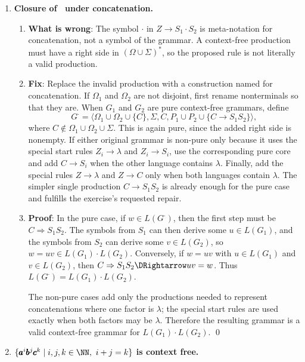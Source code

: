 \begin{enumerate}[{9.}1. ]
\item \textbf{Closure of \CSIG\ under concatenation.}

\begin{enumerate}
\item \textbf{What is wrong}: The symbol $\cdot$ in $Z \to S_1 \cdot S_2$ is
meta-notation for concatenation, not a symbol of the grammar.  A context-free
production must have a right side in $(\Omega \cup \Sigma)^*$, so the proposed
rule is not literally a valid production.

\item \textbf{Fix}: Replace the invalid production with a construction named for
concatenation.  If $\Omega_1$ and $\Omega_2$ are not disjoint, first rename
nonterminals so that they are.  When $G_1$ and $G_2$ are pure context-free
grammars, define
\[
G^{\cdot}=\langle \Omega_1\cup\Omega_2\cup\{C\},\Sigma,C,
P_1\cup P_2\cup\{C\to S_1S_2\}\rangle,
\]
where $C\notin\Omega_1\cup\Omega_2\cup\Sigma$.
This is again pure, since the added right side is nonempty.  If either original
grammar is non-pure only because it uses the special start rules
$Z_i\to\lambda$ and $Z_i\to S_i$, use the corresponding pure core and add
$C\to S_i$ when the other language contains $\lambda$.  Finally, add the
special rules $Z\to\lambda$ and $Z\to C$ only when both languages contain
$\lambda$.  The simpler single production $C\to S_1S_2$ is already enough for the
pure case and fulfills the exercise's requested repair.

\item \textbf{Proof}: In the pure case, if $w\in L(G^{\cdot})$, then the first
step must be $C\Rightarrow S_1S_2$.  The symbols from $S_1$ can then derive
some $u\in L(G_1)$, and the symbols from $S_2$ can derive some $v\in L(G_2)$,
so $w=uv\in L(G_1)\cdot L(G_2)$.  Conversely, if $w=uv$ with
$u\in L(G_1)$ and $v\in L(G_2)$, then
$C\Rightarrow S_1S_2 \DRightarrow uv = w$.  Thus
$L(G^{\cdot})=L(G_1)\cdot L(G_2)$.

The non-pure cases add only the productions needed to represent concatenations
where one factor is $\lambda$; the special start rules are used exactly when
both factors may be $\lambda$.  Therefore the resulting grammar is a valid
context-free grammar for $L(G_1)\cdot L(G_2)$. \qed
\end{enumerate}

\item \textbf{$\{\pmb{a}^i\pmb{b}^j\pmb{c}^k \mid i,j,k \in \NN,\ i+j=k\}$ is context free.}


\end{enumerate}
